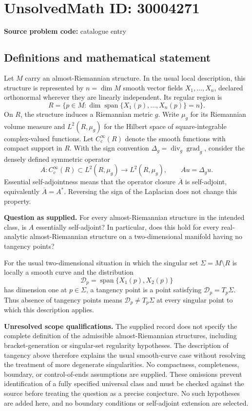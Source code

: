 \documentclass[11pt]{article}
\begin{document}
\section*{UnsolvedMath ID: 30004271}
\textbf{Source problem code:} catalogue entry
\subsection{Definitions and mathematical statement}
Let \(M\) carry an almost-Riemannian structure. In the usual local description, this structure is represented by \(n=\dim M\) smooth vector fields \(X_1,\ldots,X_n\), declared orthonormal wherever they are linearly independent. Its regular region is
\[
R=\{p\in M:\dim\operatorname{span}\{X_1(p),\ldots,X_n(p)\}=n\}.
\]
On \(R\), the structure induces a Riemannian metric \(g\). Write \(\mu_g\) for its Riemannian volume measure and \(L^2(R,\mu_g)\) for the Hilbert space of square-integrable complex-valued functions. Let \(C_c^\infty(R)\) denote the smooth functions with compact support in \(R\). With the sign convention \(\Delta_g=\operatorname{div}_g\operatorname{grad}_g\), consider the densely defined symmetric operator
\[
A:C_c^\infty(R)\subset L^2(R,\mu_g)\longrightarrow L^2(R,\mu_g),
\qquad Au=\Delta_g u.
\]
Essential self-adjointness means that the operator closure \(\overline A\) is self-adjoint, equivalently \(\overline A=A^*\). Reversing the sign of the Laplacian does not change this property.

\textbf{Question as supplied.} For every almost-Riemannian structure in the intended class, is \(A\) essentially self-adjoint? In particular, does this hold for every real-analytic almost-Riemannian structure on a two-dimensional manifold having no tangency points?

For the usual two-dimensional situation in which the singular set \(\Sigma=M\setminus R\) is locally a smooth curve and the distribution
\[
\mathcal D_p=\operatorname{span}\{X_1(p),X_2(p)\}
\]
has dimension one at \(p\in\Sigma\), a tangency point is a point satisfying \(\mathcal D_p=T_p\Sigma\). Thus absence of tangency points means \(\mathcal D_p\ne T_p\Sigma\) at every singular point to which this description applies.

\textbf{Unresolved scope qualifications.} The supplied record does not specify the complete definition of the admissible almost-Riemannian structures, including bracket-generation or singular-set regularity hypotheses. The description of tangency above therefore explains the usual smooth-curve case without resolving the treatment of more degenerate singularities. No compactness, completeness, boundary, or control-of-ends assumptions are supplied. These omissions prevent identification of a fully specified universal class and must be checked against the source before treating the question as a precise conjecture. No such hypotheses are added here, and no boundary conditions or self-adjoint extension are selected.
\end{document}
